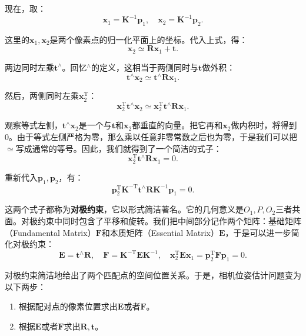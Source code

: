 现在，取：
\begin{equation}
{\bm{x}_1} = {\bm{K}^{ - 1}}{\bm{p}_1}, \quad {\bm{x}_2} = {\bm{K}^{ - 1}}{\bm{p}_2}.
\end{equation}

这里的$\bm{x}_1, \bm{x}_2$是两个像素点的归一化平面上的坐标。代入上式，得：
\begin{equation}
{\bm{x}_2} \simeq \bm{R} {\bm{x}_1} + \bm{t}.
\end{equation}

两边同时左乘$\bm{t}^\wedge$。回忆$^\wedge$的定义，这相当于两侧同时与$\bm{t}$做外积：
\begin{equation}
\bm{t}^\wedge \bm{x}_2 \simeq \bm{t}^\wedge \bm{R} \bm{x}_1.
\end{equation}

然后，两侧同时左乘$\bm{x}_2^\mathrm{T}$：
\begin{equation}
\bm{x}_2^\mathrm{T} \bm{t}^\wedge \bm{x}_2 \simeq \bm{x}_2^\mathrm{T} \bm{t}^\wedge \bm{R} \bm{x}_1.
\end{equation}

观察等式左侧，$\bm{t}^\wedge \bm{x}_2$是一个与$\bm{t}$和$\bm{x}_2$都垂直的向量。把它再和$\bm{x}_2$做内积时，将得到0。由于等式左侧严格为零，那么乘以任意非零常数之后也为零，于是我们可以把$\simeq$写成通常的等号。因此，我们就得到了一个简洁的式子：
\begin{equation}
 \bm{x}_2^\mathrm{T} \bm{t}^\wedge \bm{R} \bm{x}_1 = 0.
\end{equation}

重新代入$\bm{p}_1, \bm{p}_2$，有：
\begin{equation}
\bm{p}_2^\mathrm{T} \bm{K}^{-\mathrm{T}} \bm{t}^\wedge \bm{R} \bm{K}^{-1} \bm{p}_1  = 0.
\end{equation}

这两个式子都称为\textbf{对极约束}，它以形式简洁著名。它的几何意义是$O_1, P, O_2$三者共面。对极约束中同时包含了平移和旋转。我们把中间部分记作两个矩阵：基础矩阵（Fundamental Matrix）$\bm{F}$和本质矩阵（Essential Matrix）$\bm{E}$，于是可以进一步简化对极约束：
\begin{equation}
\bm{E} = \bm{t}^ \wedge \bm{R}, \quad \bm{F} = \bm{K}^{ -\mathrm{T}} \bm{E} {\bm{K}^{ - 1}}, \quad \bm{x}_2^\mathrm{T} \bm{E} {\bm{x}_1} = \bm{p}_2^\mathrm{T} \bm{F} {\bm{p}_1} = 0.
\end{equation}

对极约束简洁地给出了两个匹配点的空间位置关系。于是，相机位姿估计问题变为以下两步：

\begin{enumerate}
	\item 根据配对点的像素位置求出$\bm{E}$或者$\bm{F}$。
	\item 根据$\bm{E}$或者$\bm{F}$求出$\bm{R}, \bm{t}$。
\end{enumerate}

